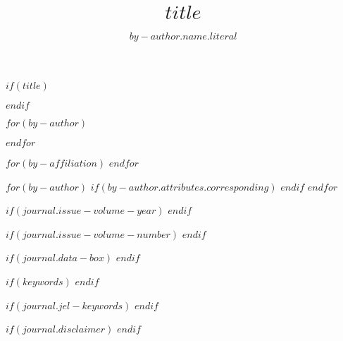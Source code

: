 $if(title)$
\title{$title$}
$endif$

$for(by-author)$
\author[$if(by-author.affiliations)$$for(by-author.affiliations)$$it.id$$sep$,$endfor$$endif$%
$if(by-author.attributes.corresponding)$,*$endif$%
]{$by-author.name.literal$}
$endfor$

$for(by-affiliation)$
$endfor$

$for(by-author)$
$if(by-author.attributes.corresponding)$
$endif$
$endfor$

$if(journal.issue-volume-year)$
$endif$

$if(journal.issue-volume-number)$
$endif$

$if(journal.data-box)$
$endif$

$if(keywords)$
$endif$

$if(journal.jel-keywords)$
$endif$

$if(journal.disclaimer)$
$endif$